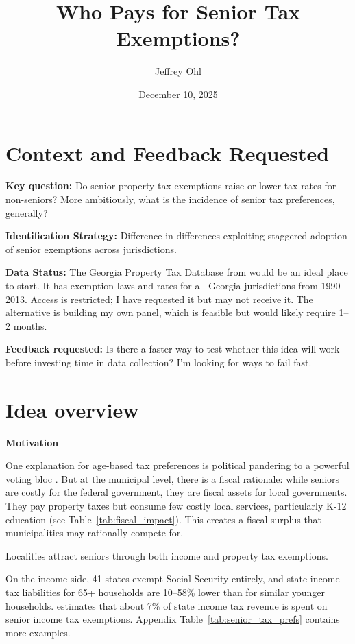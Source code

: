 \documentclass[11pt]{article}
\title{Who Pays for Senior Tax Exemptions?}
\author{Jeffrey Ohl}
\date{December 10, 2025}
\begin{document}
\maketitle

\section*{Context and Feedback Requested}

\textbf{Key question:} Do senior property tax exemptions raise or lower tax rates for non-seniors? More ambitiously, what is the incidence of senior tax preferences, generally?

\textbf{Identification Strategy:} Difference-in-differences exploiting staggered adoption of senior exemptions across jurisdictions.

\textbf{Data Status:} The Georgia Property Tax Database from \citet{banzhaf2021age} would be an ideal place to start. It has exemption laws and rates for all Georgia jurisdictions from 1990--2013. Access is restricted; I have requested it but may not receive it. The alternative is building my own panel, which is feasible but would likely require 1--2 months.

\textbf{Feedback requested:} Is there a faster way to test whether this idea will work before investing time in data collection? I'm looking for ways to fail fast.

\section{Idea overview}
 \textbf{Motivation}

   One explanation for age-based tax preferences is political pandering to a powerful voting bloc \citep{mulligan1999gerontocracy}. But at the municipal level, there is a fiscal rationale: while seniors are costly for the federal government, they are fiscal assets for local governments. They pay property taxes but consume few costly local services, particularly K-12 education (see Table~\ref{tab:fiscal_impact}). This creates a fiscal surplus that municipalities may rationally compete for.

    Localities attract seniors through both income and property tax exemptions.

    On the income side, 41 states exempt Social Security entirely, and state income tax liabilities for 65+ households are 10--58\% lower than for similar younger households. \citep{BrewerConwayRork2017} estimates that about 7\% of state income tax revenue is spent on senior income tax exemptions. Appendix Table~\ref{tab:senior_tax_prefs} contains more examples.
\end{document}
